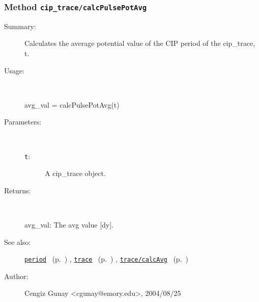 \subsubsection[Method \texttt{calcPulsePotAvg}]{Method \texttt{cip\_trace/calcPulsePotAvg}}%
%
\label{ref_cip_trace__calcPulsePotAvg}%
\hypertarget{ref_cip_trace__calcPulsePotAvg}{}%
\begin{description}
\item[Summary:]Calculates the average potential value of the 
		CIP period of the cip\_trace, t. 
%
\item[Usage:]~%
\begin{lyxcode}%
avg\_val = calcPulsePotAvg(t)
%
\end{lyxcode}%
%
%
\item[Parameters:]~
\begin{description}%
\item[\texttt{t}:]
 A cip\_trace object.
\end{description}%
%
\item[Returns:]~

	avg\_val: The avg value [dy].
%
%
\item[See also:]%
\hyperlink{ref_period}{\texttt{period}}%
\ (p.~\pageref{ref_period})%
%
, \hyperlink{ref_trace}{\texttt{trace}}%
\ (p.~\pageref{ref_trace})%
%
, \hyperlink{ref_trace__calcAvg}{\texttt{trace/calcAvg}}%
\ (p.~\pageref{ref_trace__calcAvg})%
%
%
\item[Author:]%
Cengiz Gunay <cgunay@emory.edu>, 2004/08/25%
\end{description}
\methodline%
